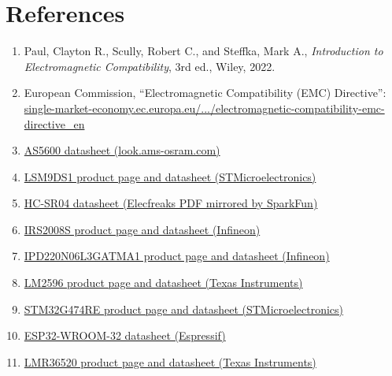 \section{References}

\begin{enumerate}
  \item \label{ref:paul-emc} Paul, Clayton R., Scully, Robert C., and Steffka, Mark A., \textit{Introduction to Electromagnetic Compatibility}, 3rd ed., Wiley, 2022.
  \item \label{ref:ec-emc-directive} European Commission, ``Electromagnetic Compatibility (EMC) Directive'': \href{https://single-market-economy.ec.europa.eu/sectors/electrical-and-electronic-engineering-industries-eei/electromagnetic-compatibility-emc-directive_en}{single-market-economy.ec.europa.eu/.../electromagnetic-compatibility-emc-directive\_en}
  \item \label{ref:as5600-datasheet} \href{https://look.ams-osram.com/m/7059eac7531a86fd/original/AS5600-DS000365.pdf?}{AS5600 datasheet (look.ams-osram.com)}
  \item \label{ref:lsm9ds1-datasheet} \href{https://www.st.com/en/mems-and-sensors/lsm9ds1.html}{LSM9DS1 product page and datasheet (STMicroelectronics)}
  \item \label{ref:hc-sr04-datasheet} \href{https://cdn.sparkfun.com/datasheets/Sensors/Proximity/HCSR04.pdf}{HC-SR04 datasheet (Elecfreaks PDF mirrored by SparkFun)}
  \item \label{ref:irs2008s-datasheet} \href{https://www.infineon.com/cms/en/product/power/gate-driver-ics/irs2008s/}{IRS2008S product page and datasheet (Infineon)}
  \item \label{ref:ipd220n06l3g-datasheet} \href{https://www.infineon.com/cms/en/product/power/mosfet/n-channel/ipd220n06l3-g/}{IPD220N06L3GATMA1 product page and datasheet (Infineon)}
  \item \label{ref:lm2596-datasheet} \href{https://www.ti.com/product/LM2596}{LM2596 product page and datasheet (Texas Instruments)}
  \item \label{ref:stm32g474re-datasheet} \href{https://www.st.com/en/microcontrollers-microprocessors/stm32g474re.html}{STM32G474RE product page and datasheet (STMicroelectronics)}
  \item \label{ref:esp32-wroom-32-datasheet} \href{https://www.espressif.com/sites/default/files/documentation/esp32-wroom-32_datasheet_en.pdf}{ESP32-WROOM-32 datasheet (Espressif)}
  \item \label{ref:lmr36520-datasheet} \href{https://www.ti.com/product/LMR36520}{LMR36520 product page and datasheet (Texas Instruments)}

\end{enumerate}
